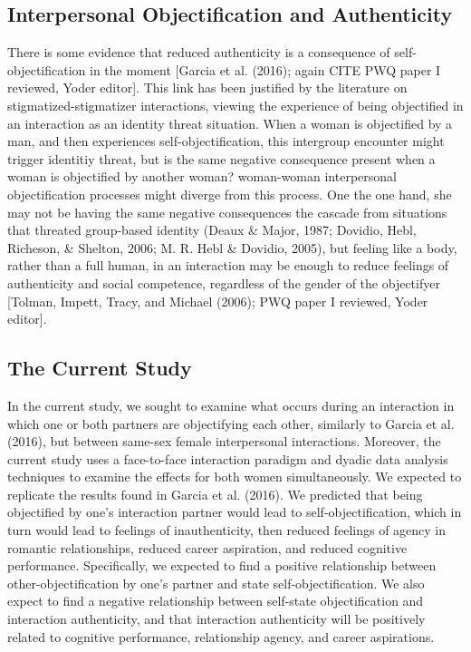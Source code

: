 \documentclass[man]{apa6}
\begin{document}
\subsection{Interpersonal Objectification and
Authenticity}\label{interpersonal-objectification-and-authenticity}

There is some evidence that reduced authenticity is a consequence of
self-objectification in the moment {[}Garcia et al. (2016); again CITE
PWQ paper I reviewed, Yoder editor{]}. This link has been justified by
the literature on stigmatized-stigmatizer interactions, viewing the
experience of being objectified in an interaction as an identity threat
situation. When a woman is objectified by a man, and then experiences
self-objectification, this intergroup encounter might trigger identitiy
threat, but is the same negative consequence present when a woman is
objectified by another woman? woman-woman interpersonal objectification
processes might diverge from this process. One the one hand, she may not
be having the same negative consequences the cascade from situations
that threated group-based identity (Deaux \& Major, 1987; Dovidio, Hebl,
Richeson, \& Shelton, 2006; M. R. Hebl \& Dovidio, 2005), but feeling
like a body, rather than a full human, in an interaction may be enough
to reduce feelings of authenticity and social competence, regardless of
the gender of the objectifyer {[}Tolman, Impett, Tracy, and Michael
(2006); PWQ paper I reviewed, Yoder editor{]}.

\subsection{The Current Study}\label{the-current-study}

In the current study, we sought to examine what occurs during an
interaction in which one or both partners are objectifying each other,
similarly to Garcia et al. (2016), but between same-sex female
interpersonal interactions. Moreover, the current study uses a
face-to-face interaction paradigm and dyadic data analysis techniques to
examine the effects for both women simultaneously. We expected to
replicate the results found in Garcia et al. (2016). We predicted that
being objectified by one's interaction partner would lead to
self-objectification, which in turn would lead to feelings of
inauthenticity, then reduced feelings of agency in romantic
relationships, reduced career aspiration, and reduced cognitive
performance. Specifically, we expected to find a positive relationship
between other-objectification by one's partner and state
self-objectification. We also expect to find a negative relationship
between self-state objectification and interaction authenticity, and
that interaction authenticity will be positively related to cognitive
performance, relationship agency, and career aspirations.
\end{document}
